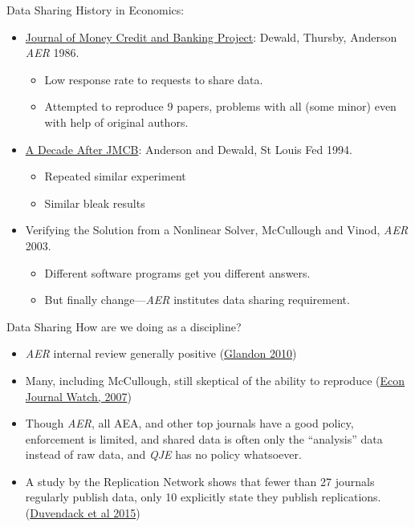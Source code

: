 \documentclass{beamer}
\begin{document}
\begin{frame}{Data Sharing}
History in Economics:
\begin{itemize}
\item  \href{http://www.jstor.org/stable/1806061}{Journal of Money Credit and Banking Project}: Dewald, Thursby, Anderson \textit{AER} 1986. 
 \begin{itemize}
 \item Low response rate to requests to share data.
 \item Attempted to reproduce 9 papers, problems with all (some minor) even with help of original authors.
 \end{itemize}
\item \href{https://research.stlouisfed.org/publications/review/94/11/Replication_Nov_Dec1994.pdf}{A Decade After JMCB}: Anderson and Dewald, St Louis Fed 1994.
 \begin{itemize}
 \item Repeated similar experiment
 \item Similar bleak results
 \end{itemize}
 \pause
\item Verifying the Solution from a Nonlinear Solver, McCullough and Vinod, \textit{AER} 2003.
 \begin{itemize}
 \item Different software programs get you different answers.
 \item But finally change---\textit{AER} institutes data sharing requirement. \href{https://www.aeaweb.org/aer/data.php}{}
 \end{itemize} 
\end{itemize}
\end{frame}


\begin{frame}{Data Sharing}
How are we doing as a discipline?
\begin{itemize}
\item \textit{AER} internal review generally positive (\href{https://www.aeaweb.org/aer/2011_Data_Compliance_Report.pdf}{Glandon 2010})

\item Many, including McCullough, still skeptical of the ability to reproduce (\href{http://econjwatch.org/articles/got-replicability-the-journal-of-money-credit-and-banking-archive}{Econ Journal Watch, 2007})

\item Though \textit{AER}, all AEA, and other top journals have a good policy, enforcement is limited, and shared data is often only the ``analysis'' data instead of raw data, and \textit{QJE} has no policy whatsoever.

\item A study by the Replication Network shows that fewer than 27 journals regularly publish data, only 10 explicitly state they publish replications. (\href{http://econjwatch.org/articles/replications-in-economics-a-progress-report}{Duvendack et al 2015})

\end{itemize}
\end{frame}
\end{document}

